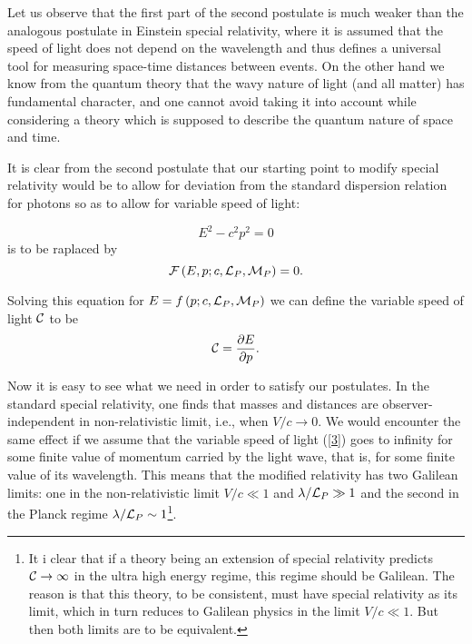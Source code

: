 \documentclass [11pt] {article}
\begin{document}
Let us observe that the first part of the second postulate is much
weaker than the analogous postulate in Einstein special
relativity, where it is assumed that the speed of light does not
depend on the wavelength and thus defines a universal tool for
measuring space-time distances between events. On the other hand
we know from the quantum theory that the wavy nature of light (and
all matter) has fundamental character, and one cannot avoid taking
it into account while considering a theory which is supposed to
describe the quantum nature of space and time.
\newline





It is clear from the second postulate that our starting point to
modify special relativity would be to allow for deviation from the
standard dispersion relation for photons so as to allow for
variable speed of light:

\begin{equation}\label{1}
 E^2 - c^2 p^2 = 0
\end{equation}
is to be raplaced by
\begin{equation}\label{2}
  {\cal F}\left(E, p; c, {\cal L}_P, {\cal M}_P\right) =0.
\end{equation}

Solving this equation for $E = f\left(p; c, {\cal L}_P, {\cal
M}_P\right)$ we can define the variable speed of light ${\cal C}$
to be
\begin{equation}\label{3}
{\cal C} = \frac{\partial E}{\partial p}.
\end{equation}

Now it is easy to see what we need in order to satisfy our postulates. In 
the standard special relativity, one finds that masses and distances are 
observer-independent in non-relativistic limit, i.e., when $V/c 
\rightarrow0$. We would encounter the same effect if we assume that the 
variable speed of light (\ref{3}) goes to infinity for some finite value of 
momentum carried by the light wave, that is, for some finite value of its 
wavelength. This means that the modified relativity has two Galilean 
limits: one in the non-relativistic limit $V/c \ll 1$ and $\lambda/{\cal L}_P 
\gg 1$ and the second in the Planck regime $\lambda/{\cal L}_P \sim 
1$\footnote{It i clear that if a theory being an extension of special 
relativity predicts ${\cal C} \rightarrow \infty$ in the ultra high energy 
regime, this regime should be Galilean. The reason is that this theory, to 
be consistent, must have special relativity as its limit, which in turn 
reduces to Galilean physics in the limit $V/c \ll 1$. But then both limits 
are to be equivalent.}. 
\end{document}
